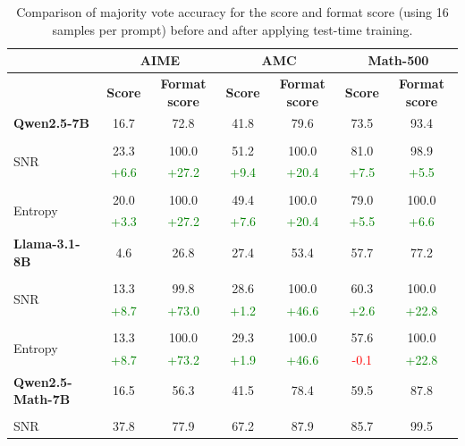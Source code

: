 \begin{table}[ht!]
\caption{Comparison of majority vote accuracy for the  score and format score (using 16 samples per prompt) before and after applying test-time training.}
\label{tab:test-time-training-results-majority-format-score}
\begin{center}
\footnotesize
\begin{tabular}{lcccccc}
\toprule
     & \multicolumn{2}{c}{\textbf{AIME}} & \multicolumn{2}{c}{\textbf{AMC}} & \multicolumn{2}{c}{\textbf{Math\scriptsize-500\footnotesize}} \\
\midrule
     & \textbf{Score} & \textbf{Format score}  & \textbf{Score} & \textbf{Format score}  & \textbf{Score} & \textbf{Format score}\\
\midrule
\textbf{Qwen2.5-7B} & 16.7 & 72.8 &41.8  & 79.6 &73.5 &  93.4\\
\\
\multirow{2}{*}{SNR} &23.3& 100.0 &51.2&100.0 &81.0& 98.9\\
 &\textcolor{green}{+6.6} & \textcolor{green}{+27.2}  &\textcolor{green}{+9.4} & \textcolor{green}{+20.4}&\textcolor{green}{+7.5} & \textcolor{green}{+5.5} \\
 \\
\multirow{2}{*}{Entropy} &20.0& 100.0 &49.4&100.0 &79.0& 100.0\\
 & \textcolor{green}{+3.3}& \textcolor{green}{+27.2}   &\textcolor{green}{+7.6} & \textcolor{green}{+20.4}&\textcolor{green}{+5.5} & \textcolor{green}{+6.6}\\
\midrule
\textbf{Llama-3.1-8B} &4.6& 26.8 &27.4& 53.4 &57.7 & 77.2\\
\\
\multirow{2}{*}{SNR}  &13.3 & 99.8 &28.6& 100.0&60.3& 100.0\\
& \textcolor{green}{+8.7} & \textcolor{green}{+73.0}  &\textcolor{green}{+1.2}& \textcolor{green}{+46.6} &\textcolor{green}{+2.6} & \textcolor{green}{+22.8}\\
 \\
\multirow{2}{*}{Entropy}   & 13.3 & 100.0 & 29.3 & 100.0&57.6& 100.0\\
&\textcolor{green}{+8.7}& \textcolor{green}{+73.2} &\textcolor{green}{+1.9}& \textcolor{green}{+46.6} & \textcolor{red}{-0.1} & \textcolor{green}{+22.8}\\
\midrule
\textbf{Qwen2.5-Math-7B} &16.5& 56.3 &41.5 & 78.4 &59.5& 87.8\\
\\
\multirow{2}{*}{SNR}  &37.8& 77.9 &67.2 & 87.9 &85.7& 99.5\\

\end{tabular}
\end{center}
\end{table}
